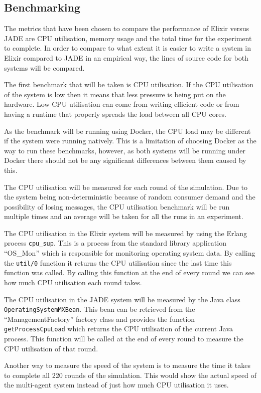 \subsection{Benchmarking}

The metrics that have been chosen to compare the performance of Elixir versus JADE are CPU utilisation, memory usage and the total time for the experiment to complete.
In order to compare to what extent it is easier to write a system in Elixir compared to JADE in an empirical way, the lines of source code for both systems will be compared.

The first benchmark that will be taken is CPU utilisation.
If the CPU utilisation of the system is low then it means that less pressure is being put on the hardware.
Low CPU utilisation can come from writing efficient code or from having a runtime that properly spreads the load between all CPU cores.

As the benchmark will be running using Docker, the CPU load may be different if the system were running natively.
This is a limitation of choosing Docker as the way to run these benchmarks, however, as both systems will be running under Docker there should not be any significant differences between them caused by this.

The CPU utilisation will be measured for each round of the simulation.
Due to the system being non-deterministic because of random consumer demand and the possibility of losing messages, the CPU utilisation benchmark will be run multiple times and an average will be taken for all the runs in an experiment.

The CPU utilisation in the Elixir system will be measured by using the Erlang process \verb|cpu_sup|.
This is a process from the standard library application ``OS\_Mon'' which is responsible for monitoring operating system data.
By calling the \verb|util/0| function it returns the CPU utilisation since the last time this function was called.
By calling this function at the end of every round we can see how much CPU utilisation each round takes.

The CPU utilisation in the JADE system will be measured by the Java class \verb|OperatingSystemMXBean|.
This bean can be retrieved from the ``ManagementFactory'' factory class and provides the function \verb|getProcessCpuLoad| which returns the CPU utilisation of the current Java process.
This function will be called at the end of every round to measure the CPU utilisation of that round.

Another way to measure the speed of the system is to measure the time it takes to complete all 220 rounds of the simulation.
This would show the actual speed of the multi-agent system instead of just how much CPU utilisation it uses.

